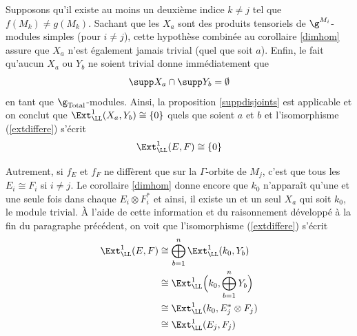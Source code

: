 \begin{Thm}
\begin{pre}
Supposons qu'il existe au moins un deuxième indice $k \neq j$ tel que $f(M_k) \neq g(M_k)$. Sachant que les $X_a$ sont des produits tensoriels de $\g^{M_i}$-modules simples (pour $i \neq j$), cette hypothèse combinée au corollaire \ref{dimhom} assure que $X_a$ n'est également jamais trivial (quel que soit $a$). Enfin, le fait qu'aucun $X_a$ ou $Y_b$ ne soient trivial donne immédiatement que 
$$ \supp X_a \cap \supp Y_b = \emptyset $$ en tant que $\g_\text{Total}$-modules. Ainsi, la proposition \ref{suppdisjoints} est applicable et on conclut que $\Ext_\LL^1(X_a,Y_b) \cong \{0\}$ quels que soient $a$ et $b$ et l'isomorphisme (\ref{extdiffere}) s'écrit 
$$ \Ext_\LL^1(E,F) \cong \{0\} $$

Autrement, si $f_E$ et $f_F$ ne diffèrent que sur la $\Gamma$-orbite de $M_j$, c'est que tous les $E_i \cong F_i$ si $i \neq j$. Le corollaire \ref{dimhom} donne encore que $k_0$ n'apparaît qu'une et une seule fois dans chaque $E_i \otimes F_i^*$ et ainsi, il existe un et un seul $X_a$ qui soit $k_0$, le module trivial. À l'aide de cette information et du raisonnement développé à la fin du paragraphe précédent, on voit que l'isomorphisme (\ref{extdiffere}) s'écrit
\begin{align*}
\Ext_\LL^1(E,F) &\cong \bigoplus_{b=1}^n\Ext_\LL^1(k_0,Y_b)\\
&\cong \Ext_\LL^1\Big(k_0,\bigoplus_{b=1}^n Y_b\Big)\\
&\cong \Ext_\LL^1(k_0,E_j^* \otimes F_j)\\
&\cong \Ext_\LL^1(E_j,F_j)
\end{align*}


\end{pre}
\end{Thm}
